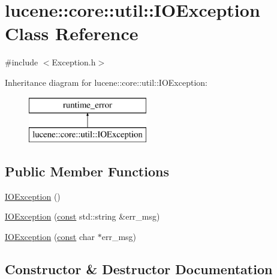 \hypertarget{classlucene_1_1core_1_1util_1_1IOException}{}\section{lucene\+:\+:core\+:\+:util\+:\+:I\+O\+Exception Class Reference}
\label{classlucene_1_1core_1_1util_1_1IOException}


{\ttfamily \#include $<$Exception.\+h$>$}

Inheritance diagram for lucene\+:\+:core\+:\+:util\+:\+:I\+O\+Exception\+:\begin{figure}[H]
\begin{center}
\leavevmode
\includegraphics[height=2.000000cm]{classlucene_1_1core_1_1util_1_1IOException}
\end{center}
\end{figure}
\subsection*{Public Member Functions}
\begin{DoxyCompactItemize}
\item 
\mbox{\hyperlink{classlucene_1_1core_1_1util_1_1IOException_a61e1bdabbda962e0f16a76660c7dd578}{I\+O\+Exception}} ()
\item 
\mbox{\hyperlink{classlucene_1_1core_1_1util_1_1IOException_a22be77a2001ab70995002dd3def56d62}{I\+O\+Exception}} (\mbox{\hyperlink{ZlibCrc32_8h_a2c212835823e3c54a8ab6d95c652660e}{const}} std\+::string \&err\+\_\+msg)
\item 
\mbox{\hyperlink{classlucene_1_1core_1_1util_1_1IOException_ace40620ad92b84c2bbe0fe46b36ff507}{I\+O\+Exception}} (\mbox{\hyperlink{ZlibCrc32_8h_a2c212835823e3c54a8ab6d95c652660e}{const}} char $\ast$err\+\_\+msg)
\end{DoxyCompactItemize}


\subsection{Constructor \& Destructor Documentation}
\mbox{\label{classlucene_1_1core_1_1util_1_1IOException_a61e1bdabbda962e0f16a76660c7dd578}} 
